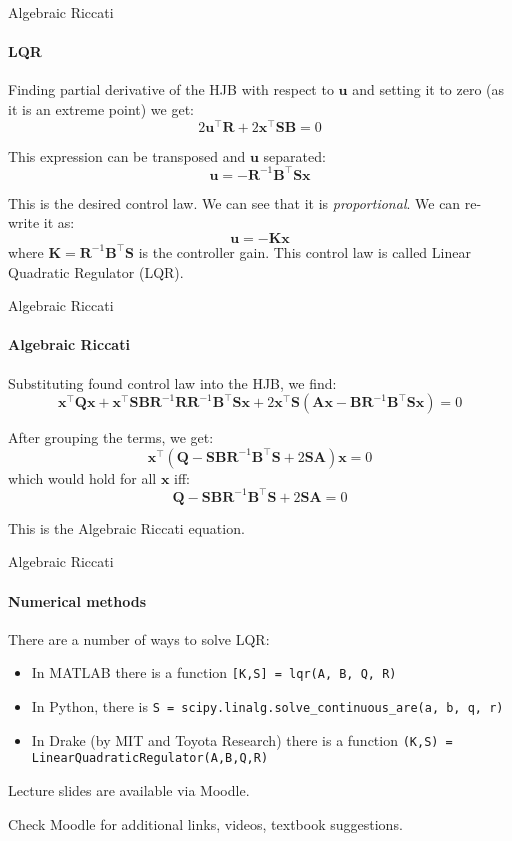 \documentclass{beamer}
\begin{document}
\begin{frame}{Algebraic Riccati}
\framesubtitle{LQR}
\begin{flushleft}


Finding partial derivative of the HJB with respect to $\mathbf u$ and setting it to zero (as it is an extreme point) we get:
\[
2 \mathbf  u^\top \mathbf R + 
2 \mathbf x^\top \mathbf S \mathbf B = 0
\]

This expression can be transposed and $\mathbf  u$ separated:
\[
\mathbf  u = 
-\mathbf R^{-1} \mathbf B^\top \mathbf S \mathbf x
\]

This is the desired control law. We can see that it is \emph{proportional}. We can re-write it as:
\[
\mathbf  u = -\mathbf K \mathbf x
\]
where $\mathbf K = \mathbf R^{-1} \mathbf B^\top \mathbf S$ is the controller gain. This control law is called Linear Quadratic Regulator (LQR).

\end{flushleft}
\end{frame}


\begin{frame}{Algebraic Riccati}
\framesubtitle{Algebraic Riccati}
\begin{flushleft}

Substituting found control law into the HJB, we find:
\[
\mathbf  x^\top \mathbf Q \mathbf x +
\mathbf x^\top \mathbf S \mathbf B \mathbf R^{-1} \mathbf R \mathbf  R^{-1} \mathbf B^\top \mathbf S \mathbf x + 
2\mathbf x^\top \mathbf S
(\mathbf A  \mathbf x - \mathbf B \mathbf R^{-1} \mathbf B^\top \mathbf S \mathbf x) = 0
\]

After grouping the terms, we get:
%
\[
\mathbf  x^\top (\mathbf Q - \mathbf S \mathbf B \mathbf  R^{-1} \mathbf B^\top \mathbf S + 
2 \mathbf S \mathbf A) \mathbf x = 0
\]
%
which would hold for all $\mathbf x$ iff:
%
\[
\mathbf Q - \mathbf S \mathbf B \mathbf  R^{-1} \mathbf B^\top \mathbf S + 2 \mathbf S \mathbf A = 0
\]

This is the Algebraic Riccati equation.

\end{flushleft}
\end{frame}

\begin{frame}{Algebraic Riccati}
\framesubtitle{Numerical methods}
\begin{flushleft}

There are a number of ways to solve LQR:
\begin{itemize}
    \item In MATLAB there is a function \texttt{[K,S] = lqr(A, B, Q, R)}
    \item In Python, there is \texttt{S = scipy.linalg.solve\_continuous\_are(a, b, q, r)}
    \item In Drake (by MIT and Toyota Research) there is a function \texttt{(K,S) = LinearQuadraticRegulator(A,B,Q,R)}
\end{itemize}

\end{flushleft}
\end{frame}



\begin{frame}
\centerline{Lecture slides are available via Moodle.}
\bigskip
\centerline{Check Moodle for additional links, videos, textbook suggestions.}
\end{frame}
\end{document}
